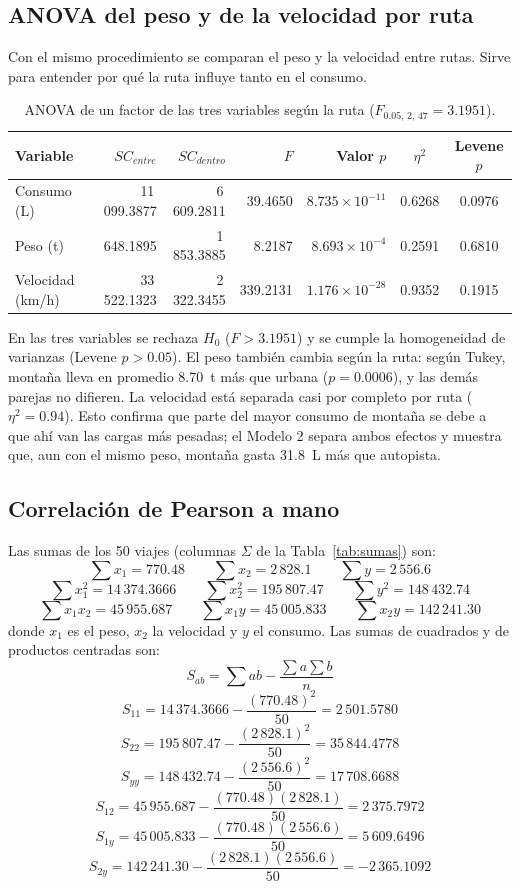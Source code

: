 \documentclass[12pt,letterpaper]{article}
\begin{document}
\subsection{ANOVA del peso y de la velocidad por ruta}

Con el mismo procedimiento se comparan el peso y la velocidad entre rutas. Sirve para entender por qué la ruta influye tanto en el consumo.

\begin{table}[H]
\centering
\caption{ANOVA de un factor de las tres variables según la ruta ($F_{0.05,\,2,\,47} = 3.1951$).}
\small\setlength{\tabcolsep}{4pt}
\begin{tabular}{lrrrrcc}
\toprule
Variable & $SC_{entre}$ & $SC_{dentro}$ & $F$ & Valor $p$ & $\eta^2$ & Levene $p$ \\
\midrule
Consumo (L) & 11\,099.3877 & 6\,609.2811 & 39.4650 & $8.735 \times 10^{-11}$ & 0.6268 & 0.0976 \\
Peso (t) & 648.1895 & 1\,853.3885 & 8.2187 & $8.693 \times 10^{-4}$ & 0.2591 & 0.6810 \\
Velocidad (km/h) & 33\,522.1323 & 2\,322.3455 & 339.2131 & $1.176 \times 10^{-28}$ & 0.9352 & 0.1915 \\
\bottomrule
\end{tabular}
\end{table}

En las tres variables se rechaza $H_0$ ($F > 3.1951$) y se cumple la homogeneidad de varianzas (Levene $p > 0.05$). El peso también cambia según la ruta: según Tukey, montaña lleva en promedio 8.70~t más que urbana ($p = 0.0006$), y las demás parejas no difieren. La velocidad está separada casi por completo por ruta ($\eta^2 = 0.94$). Esto confirma que parte del mayor consumo de montaña se debe a que ahí van las cargas más pesadas; el Modelo 2 separa ambos efectos y muestra que, aun con el mismo peso, montaña gasta 31.8~L más que autopista.


\subsection{Correlación de Pearson a mano}

Las sumas de los 50 viajes (columnas $\Sigma$ de la Tabla~\ref{tab:sumas}) son:
$$ \sum x_1 = 770.48 \qquad \sum x_2 = 2\,828.1 \qquad \sum y = 2\,556.6 $$
$$ \sum x_1^2 = 14\,374.3666 \qquad \sum x_2^2 = 195\,807.47 \qquad \sum y^2 = 148\,432.74 $$
$$ \sum x_1 x_2 = 45\,955.687 \qquad \sum x_1 y = 45\,005.833 \qquad \sum x_2 y = 142\,241.30 $$
donde $x_1$ es el peso, $x_2$ la velocidad y $y$ el consumo. Las sumas de cuadrados y de productos centradas son:
$$ S_{ab} = \sum ab - \frac{\sum a \sum b}{n} $$
$$ S_{11} = 14\,374.3666 - \frac{(770.48)^2}{50} = 2\,501.5780 $$
$$ S_{22} = 195\,807.47 - \frac{(2\,828.1)^2}{50} = 35\,844.4778 $$
$$ S_{yy} = 148\,432.74 - \frac{(2\,556.6)^2}{50} = 17\,708.6688 $$
$$ S_{12} = 45\,955.687 - \frac{(770.48)(2\,828.1)}{50} = 2\,375.7972 $$
$$ S_{1y} = 45\,005.833 - \frac{(770.48)(2\,556.6)}{50} = 5\,609.6496 $$
$$ S_{2y} = 142\,241.30 - \frac{(2\,828.1)(2\,556.6)}{50} = -2\,365.1092 $$
\end{document}
